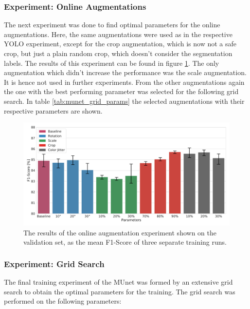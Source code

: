 \subsubsection{Experiment: Online Augmentations}

The next experiment was done to find optimal parameters for the online augmentations.
Here, the same augmentations were used as in the respective YOLO experiment, except for the crop augmentation, which is now not a safe crop, but just a plain random crop, which doesn't consider the segmentation labels.
The results of this experiment can be found in figure \ref{fig:munet_online_exp}.
The only augmentation which didn't increase the performance was the scale augmentation.
It is hence not used in further experiments.
From the other augmentations again the one with the best performing parameter was selected for the following grid search.
In table \ref{tab:munet_grid_params} the selected augmentations with their respective parameters are shown.

\begin{figure}
\begin{center}
    \includegraphics[width=\columnwidth]{imgs/munet_online_aug_experiment.pdf}
    \caption{The results of the online augmentation experiment shown on the validation set, as the mean F1-Score of three separate training runs.}
    \label{fig:munet_online_exp}
\end{center}
\end{figure}

\subsubsection{Experiment: Grid Search}

The final training experiment of the \ac{MUnet} was formed by an extensive grid search to obtain the optimal parameters for the training.
The grid search was performed on the following parameters:

